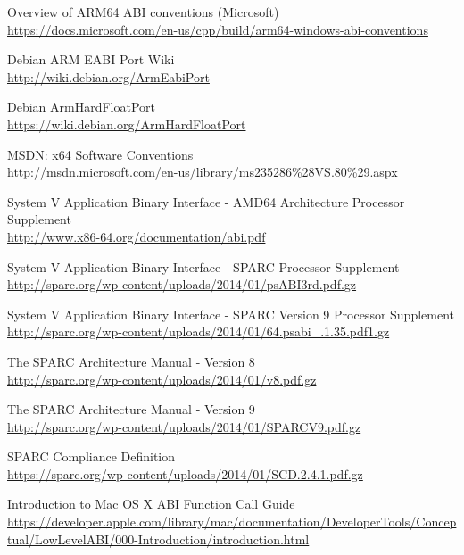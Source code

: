 \begin{thebibliography}{99}
	Overview of ARM64 ABI conventions (Microsoft)\\
	\url{https://docs.microsoft.com/en-us/cpp/build/arm64-windows-abi-conventions}

	Debian ARM EABI Port Wiki\\
	\url{http://wiki.debian.org/ArmEabiPort}

	Debian ArmHardFloatPort\\
	\url{https://wiki.debian.org/ArmHardFloatPort}

	MSDN: x64 Software Conventions\\
	\url{http://msdn.microsoft.com/en-us/library/ms235286\%28VS.80\%29.aspx}

	System V Application Binary Interface - AMD64 Architecture Processor Supplement\\
	\url{http://www.x86-64.org/documentation/abi.pdf}

	System V Application Binary Interface - SPARC Processor Supplement\\
	\url{http://sparc.org/wp-content/uploads/2014/01/psABI3rd.pdf.gz}

	System V Application Binary Interface - SPARC Version 9 Processor Supplement\\
	\url{http://sparc.org/wp-content/uploads/2014/01/64.psabi\_.1.35.pdf1.gz}

	The SPARC Architecture Manual - Version 8\\
	\url{http://sparc.org/wp-content/uploads/2014/01/v8.pdf.gz}

	The SPARC Architecture Manual - Version 9\\
	\url{http://sparc.org/wp-content/uploads/2014/01/SPARCV9.pdf.gz}

	SPARC Compliance Definition\\
	\url{https://sparc.org/wp-content/uploads/2014/01/SCD.2.4.1.pdf.gz}


	Introduction to Mac OS X ABI Function Call Guide\\
	\url{https://developer.apple.com/library/mac/documentation/DeveloperTools/Conceptual/LowLevelABI/000-Introduction/introduction.html}


\end{thebibliography}
